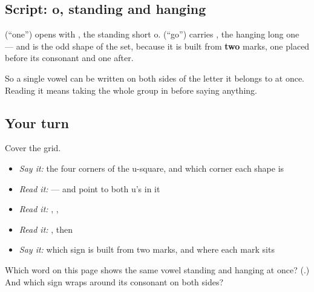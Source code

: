\subsection*{Script: o, standing and hanging}
\textbf{} (\textquotedblleft{}one\textquotedblright{}) opens with \textbf{}, the standing short o. \textbf{} (\textquotedblleft{}go\textquotedblright{}) carries \textbf{}, the hanging long one — and \textbf{} is the odd shape of the set, because it is built from \textbf{two} marks, one placed before its consonant and one after.

So a single vowel can be written on both sides of the letter it belongs to at once. Reading it means taking the whole group in before saying anything.

\subsection*{Your turn}
Cover the grid.

\begin{itemize}
\raggedright
  \item \emph{Say it:} the four corners of the u-square, and which corner each shape is
  \item \emph{Read it:} \textbf{} — and point to both u's in it
  \item \emph{Read it:} \textbf{}, \textbf{}, \textbf{}
  \item \emph{Read it:} \textbf{}, then \textbf{}
  \item \emph{Say it:} which sign is built from two marks, and where each mark sits
\end{itemize}

\begin{tcolorbox}[breakable,colback=teal!4,colframe=teal!35!black,title={Before you move on}]
Which word on this page shows the same vowel standing and hanging at once? (\textbf{}.) And which sign wraps around its consonant on both sides?
\end{tcolorbox}
